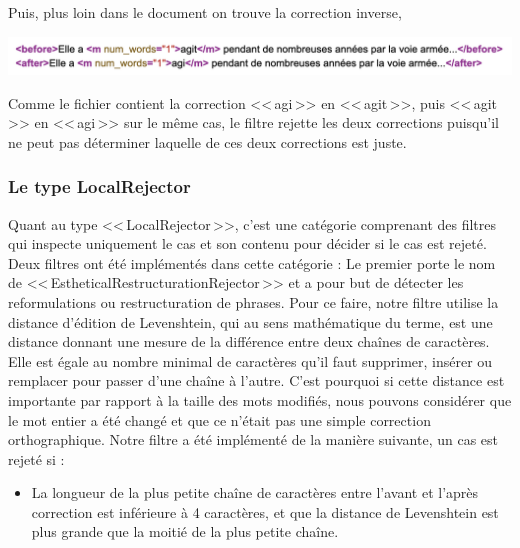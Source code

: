 \documentclass[11pt]{article}
\begin{document}
Puis, plus loin dans le document on trouve la correction inverse,

\begin{center}
\includegraphics[width=14cm]{exemple11.png} %
\end{center}

Comme le fichier contient la correction <<\,agi\,>> en <<\,agit\,>>, puis <<\,agit\,>> en <<\,agi\,>> sur le m\^{e}me cas, le filtre rejette les deux corrections puisqu'il ne peut pas d\'{e}terminer laquelle de ces deux corrections est juste.

\subsubsection{Le type LocalRejector}
Quant au type <<\,LocalRejector\,>>, c'est une cat\'{e}gorie comprenant des filtres qui inspecte uniquement le cas et son contenu pour d\'{e}cider si le cas est rejet\'{e}. Deux filtres ont \'{e}t\'{e} impl\'{e}ment\'{e}s dans cette cat\'{e}gorie :
\newline
Le premier porte le nom de <<\,EstheticalRestructurationRejector\,>> et a pour but de d\'{e}tecter les reformulations ou restructuration de phrases. Pour ce faire, notre filtre utilise la distance d'\'{e}dition de Levenshtein, qui au sens math\'{e}matique du terme, est une distance donnant une mesure de la diff\'{e}rence entre deux cha\^{i}nes de caract\`{e}res. Elle est \'{e}gale au nombre minimal de caract\`{e}res qu'il faut supprimer, ins\'{e}rer ou remplacer pour passer d'une cha\^{i}ne \`{a} l'autre. C'est pourquoi si cette distance est importante par rapport \`{a} la taille des mots modifi\'{e}s, nous pouvons consid\'{e}rer que le mot entier a \'{e}t\'{e} chang\'{e} et que ce n'\'{e}tait pas une simple correction orthographique. 
\newline
Notre filtre a \'{e}t\'{e} impl\'{e}ment\'{e} de la mani\`{e}re suivante, un cas est rejet\'{e} si :
\begin{itemize}
\item La longueur de la plus petite cha\^{i}ne de caract\`{e}res entre l'avant et l'apr\`{e}s correction est inf\'{e}rieure \`{a} 4 caract\`{e}res, et que la distance de Levenshtein est plus grande que la moiti\'{e} de la plus petite cha\^{i}ne.
\end{itemize}
\end{document}
